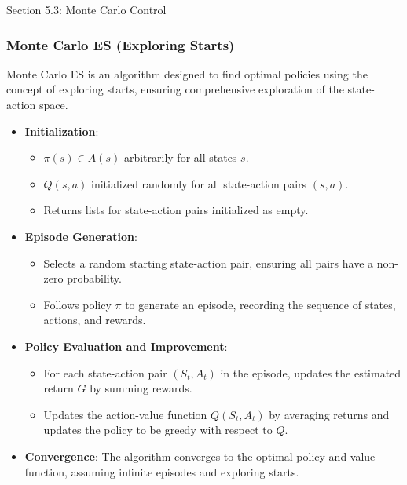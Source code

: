 \begin{notes}{Section 5.3: Monte Carlo Control}
    \subsubsection*{Monte Carlo ES (Exploring Starts)}
    
    Monte Carlo ES is an algorithm designed to find optimal policies using the concept of exploring starts, ensuring comprehensive exploration of the state-action space.
    
    \begin{highlight}
    
        \begin{itemize}
            \item \textbf{Initialization}:
                \begin{itemize}
                    \item $\pi(s) \in A(s)$ arbitrarily for all states $s$.
                    \item $Q(s, a)$ initialized randomly for all state-action pairs $(s, a)$.
                    \item Returns lists for state-action pairs initialized as empty.
                \end{itemize}
            \item \textbf{Episode Generation}:
                \begin{itemize}
                    \item Selects a random starting state-action pair, ensuring all pairs have a non-zero probability.
                    \item Follows policy $\pi$ to generate an episode, recording the sequence of states, actions, and rewards.
                \end{itemize}
            \item \textbf{Policy Evaluation and Improvement}:
                \begin{itemize}
                    \item For each state-action pair $(S_t, A_t)$ in the episode, updates the estimated return $G$ by summing rewards.
                    \item Updates the action-value function $Q(S_t, A_t)$ by averaging returns and updates the policy to be greedy with respect to $Q$.
                \end{itemize}
            \item \textbf{Convergence}: The algorithm converges to the optimal policy and value function, assuming infinite episodes and exploring starts.
        \end{itemize}
    

\end{highlight}
\end{notes}
